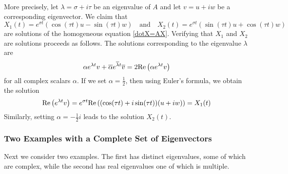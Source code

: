 \documentclass{ximera}
\begin{document}
More precisely, let $\lambda = \sigma+i\tau$ be an eigenvalue of $A$ and 
let $v=u+iw$ be a corresponding eigenvector.  We claim that 
\begin{equation}  \label{eq:reimsol}
X_1(t) = e^{\sigma t}(\cos(\tau t)u - \sin(\tau t)w)\quad
\mbox{and}\quad
X_2(t) = e^{\sigma t}(\sin(\tau t)u + \cos(\tau t)w)
\end{equation}
are solutions of the homogeneous equation \eqref{dotX=AX}.  Verifying that
$X_1$ and $X_2$ are solutions proceeds as follows.  The solutions 
corresponding to the eigenvalue $\lambda$ are 
\[
\alpha e^{\lambda t}v + \overline{\alpha} e^{\overline{\lambda}t}\overline{v}
= 2{\rm Re}\left(\alpha e^{\lambda t}v\right)
\]
for all complex scalars $\alpha$.  If we set $\alpha=\frac{1}{2}$, then 
using Euler's formula, we obtain the solution 
\[
{\rm Re}\left(e^{\lambda t}v\right) = e^{\sigma t}{\rm Re}\left((\cos(\tau t)+i\sin(\tau t))(u + iw)\right)=X_1(t)
\]
Similarly, setting $\alpha=-\frac{1}{2}i$ leads to the solution $X_2(t)$.  


\subsubsection*{Two Examples with a Complete Set of Eigenvectors}

Next we consider two examples.  The first has distinct eigenvalues, some 
of which are complex, while the second has real eigenvalues one of which is 
multiple.
\end{document}
